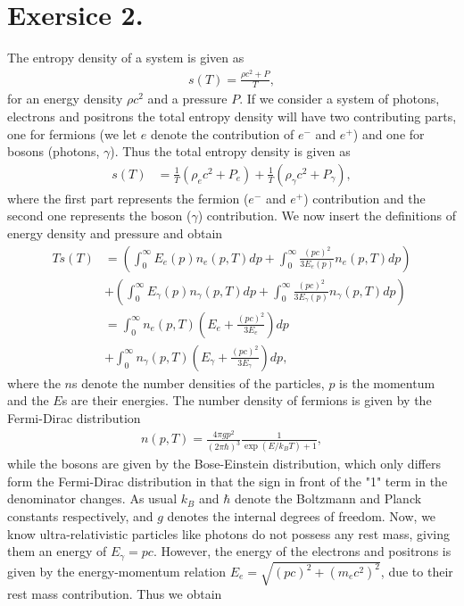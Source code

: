\documentclass{emulateapj}
\begin{document}
	\section*{Exersice 2.}
	The entropy density of a system is given as 
	\begin{align}
		s(T) = \frac{\rho c^2 + P}{T},
	\end{align}
	for an energy density $\rho c^2$ and a pressure $P$. If we consider a system of photons, electrons and positrons the total entropy density will have two contributing parts, one for fermions (we let $e$ denote the contribution of $e^-$ and $e^+$) and one for bosons (photons, $\gamma$). Thus the total entropy density is given as 
	\begin{align}
		s(T) &=  \frac{1}{T}(\rho_ec^2 + P_e) + \frac{1}{T}(\rho_\gamma c^2 + P_\gamma),
	\end{align}
	where the first part represents the fermion ($e^-$ and $e^+$) contribution and the second one represents the boson ($\gamma$) contribution. We now insert the definitions of energy density and pressure and obtain
	\begin{align*}
		Ts(T) & = \left(\int_{0}^{\infty}E_e(p)n_e(p,T)dp + \int_{0}^{\infty}\frac{(pc)^2}{3E_e(p)}n_e(p,T)dp\right)\\
		&+ \left(\int_{0}^{\infty}E_\gamma(p)n_\gamma(p,T)dp + \int_{0}^{\infty}\frac{(pc)^2}{3E_\gamma(p)}n_\gamma(p,T)dp\right)\\
		& = \int_{0}^{\infty}n_e(p,T)\left(E_e + \frac{(pc)^2}{3E_e}\right)dp \\
		&+ \int_{0}^{\infty}n_\gamma(p,T)\left(E_\gamma + \frac{(pc)^2}{3E_\gamma}\right)dp,
	\end{align*}
	where the $n$s denote the number densities of the particles, $p$ is the momentum and the $E$s are their energies. The number density of fermions is given by the Fermi-Dirac distribution 
	\begin{align}
		n(p,T) = \frac{4\pi gp^2}{(2\pi\hbar)^3}\frac{1}{\exp(E/k_BT)+1},
	\end{align}
	while the bosons are given by the Bose-Einstein distribution, which only differs form the Fermi-Dirac distribution in that the sign in front of the "1" term in the denominator changes. As usual $k_B$ and $\hbar$ denote the Boltzmann and Planck constants respectively, and $g$ denotes the internal degrees of freedom. 
	Now, we know ultra-relativistic particles like photons do not possess any rest mass, giving them an energy of $E_\gamma = pc$. However, the energy of the electrons and positrons is given by the energy-momentum relation $E_e = \sqrt{(pc)^2 + (m_ec^2)^2}$, due to their rest mass contribution. Thus we obtain
\end{document}
